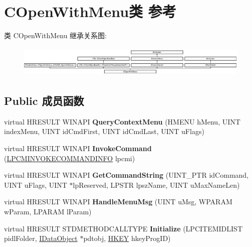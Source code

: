 \hypertarget{class_c_open_with_menu}{}\section{C\+Open\+With\+Menu类 参考}
\label{class_c_open_with_menu}
类 C\+Open\+With\+Menu 继承关系图\+:\begin{figure}[H]
\begin{center}
\leavevmode
\includegraphics[height=1.517615cm]{class_c_open_with_menu}
\end{center}
\end{figure}
\subsection*{Public 成员函数}
\begin{DoxyCompactItemize}
\item 
\mbox{\label{class_c_open_with_menu_a4dadbdd99909a0bebee99d000ac3fb36}} 
virtual H\+R\+E\+S\+U\+LT W\+I\+N\+A\+PI {\bfseries Query\+Context\+Menu} (H\+M\+E\+NU h\+Menu, U\+I\+NT index\+Menu, U\+I\+NT id\+Cmd\+First, U\+I\+NT id\+Cmd\+Last, U\+I\+NT u\+Flags)
\item 
\mbox{\label{class_c_open_with_menu_a8d4898131d565985a25fd3ac5b801530}} 
virtual H\+R\+E\+S\+U\+LT W\+I\+N\+A\+PI {\bfseries Invoke\+Command} (\hyperlink{struct_i_context_menu_1_1tag_c_m_i_n_v_o_k_e_c_o_m_m_a_n_d_i_n_f_o}{L\+P\+C\+M\+I\+N\+V\+O\+K\+E\+C\+O\+M\+M\+A\+N\+D\+I\+N\+FO} lpcmi)
\item 
\mbox{\label{class_c_open_with_menu_a0b035861353bac9253bdaf6e1f59c267}} 
virtual H\+R\+E\+S\+U\+LT W\+I\+N\+A\+PI {\bfseries Get\+Command\+String} (U\+I\+N\+T\+\_\+\+P\+TR id\+Command, U\+I\+NT u\+Flags, U\+I\+NT $\ast$lp\+Reserved, L\+P\+S\+TR lpsz\+Name, U\+I\+NT u\+Max\+Name\+Len)
\item 
\mbox{\label{class_c_open_with_menu_a56cf0593938257ef986832b54c5d6979}} 
virtual H\+R\+E\+S\+U\+LT W\+I\+N\+A\+PI {\bfseries Handle\+Menu\+Msg} (U\+I\+NT u\+Msg, W\+P\+A\+R\+AM w\+Param, L\+P\+A\+R\+AM l\+Param)
\item 
\mbox{\label{class_c_open_with_menu_af8817817514720038790c857284577bc}} 
virtual H\+R\+E\+S\+U\+LT S\+T\+D\+M\+E\+T\+H\+O\+D\+C\+A\+L\+L\+T\+Y\+PE {\bfseries Initialize} (L\+P\+C\+I\+T\+E\+M\+I\+D\+L\+I\+ST pidl\+Folder, \hyperlink{interface_i_data_object}{I\+Data\+Object} $\ast$pdtobj, \hyperlink{interfacevoid}{H\+K\+EY} hkey\+Prog\+ID)
\end{DoxyCompactItemize}
